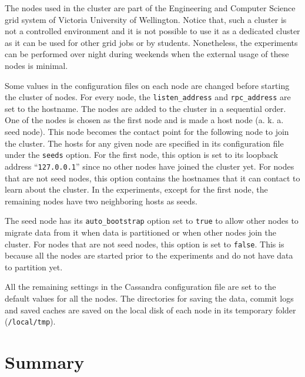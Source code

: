 The nodes used in the cluster are part of the Engineering and Computer Science
grid system of Victoria University of Wellington.  Notice that,  such a cluster is
not a controlled environment and it is not possible to use it as  a dedicated
cluster as it can be used for other grid jobs or  by students. 
Nonetheless,  the experiments can be performed over night during weekends when
the external usage of these nodes is minimal. 

Some values in the configuration files on each node are changed before starting
the cluster of nodes.   For every node,   the \texttt{listen\_address} and
\texttt{rpc\_address} are set to the hostname.   The nodes are added to the
cluster in a sequential order.   One of the nodes is chosen as the first node
and is made a host node (a. k. a.  seed node).  This node becomes the contact
point for the following node to join the cluster.  The hosts for any given node
are specified in its configuration file under the \texttt{seeds} option.   For
the first node,  this option is set to its loopback address
``\texttt{127.0.0.1}'' since no other nodes have joined the cluster yet.   For
nodes that are not seed nodes,  this option contains the hostnames that it can
contact to learn about the cluster.   In the experiments,   except for the first
node,  the remaining nodes have two
neighboring hosts  as seeds.  

The seed node has its \texttt{auto\_bootstrap} option set to \texttt{true} to
allow other nodes to migrate data from it when data is partitioned or when other
nodes join the cluster.   For nodes that are not seed nodes,   this option is set
to \texttt{false}.   This is because all the nodes are started prior to the 
experiments and do not have data to partition yet.  
 

All the remaining settings in the Cassandra configuration file are set to the
default values for all the nodes.   The directories for saving the data,  
commit logs and saved caches are saved on the local disk of each node in its
temporary folder  (\texttt{/local/tmp}).

\vfill




\section{Summary} \label{sexp:Summary} 

